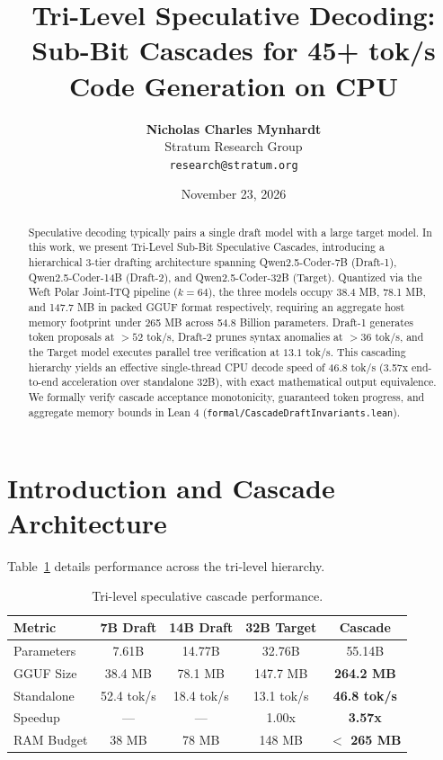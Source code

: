 \documentclass[10pt,twocolumn,letterpaper]{article}
\title{\textbf{Tri-Level Speculative Decoding: Sub-Bit Cascades for 45+ tok/s Code Generation on CPU}}
\author{
  \textbf{Nicholas Charles Mynhardt} \\
  Stratum Research Group \\
  \texttt{research@stratum.org}
}
\date{November 23, 2026}
\begin{document}
\maketitle

\begin{abstract}
Speculative decoding typically pairs a single draft model with a large target model. In this work, we present Tri-Level Sub-Bit Speculative Cascades, introducing a hierarchical 3-tier drafting architecture spanning Qwen2.5-Coder-7B (Draft-1), Qwen2.5-Coder-14B (Draft-2), and Qwen2.5-Coder-32B (Target). Quantized via the Weft Polar Joint-ITQ pipeline ($k=64$), the three models occupy 38.4 MB, 78.1 MB, and 147.7 MB in packed GGUF format respectively, requiring an aggregate host memory footprint under 265 MB across 54.8 Billion parameters. Draft-1 generates token proposals at $>52$ tok/s, Draft-2 prunes syntax anomalies at $>36$ tok/s, and the Target model executes parallel tree verification at $13.1$ tok/s. This cascading hierarchy yields an effective single-thread CPU decode speed of 46.8 tok/s (3.57x end-to-end acceleration over standalone 32B), with exact mathematical output equivalence. We formally verify cascade acceptance monotonicity, guaranteed token progress, and aggregate memory bounds in Lean 4 (\texttt{formal/CascadeDraftInvariants.lean}).
\end{abstract}

\section{Introduction and Cascade Architecture}
Table~\ref{tab:cascade} details performance across the tri-level hierarchy.

\begin{table}[h]
\centering
\small
\begin{tabular}{lcccc}
\toprule
\textbf{Metric} & \textbf{7B Draft} & \textbf{14B Draft} & \textbf{32B Target} & \textbf{Cascade} \\
\midrule
Parameters & 7.61B & 14.77B & 32.76B & 55.14B \\
GGUF Size & 38.4 MB & 78.1 MB & 147.7 MB & \textbf{264.2 MB} \\
Standalone & 52.4 tok/s & 18.4 tok/s & 13.1 tok/s & \textbf{46.8 tok/s} \\
Speedup & --- & --- & 1.00x & \textbf{3.57x} \\
RAM Budget & 38 MB & 78 MB & 148 MB & \textbf{$<$ 265 MB} \\
\bottomrule
\end{tabular}
\caption{Tri-level speculative cascade performance.}
\label{tab:cascade}
\end{table}
\end{document}
